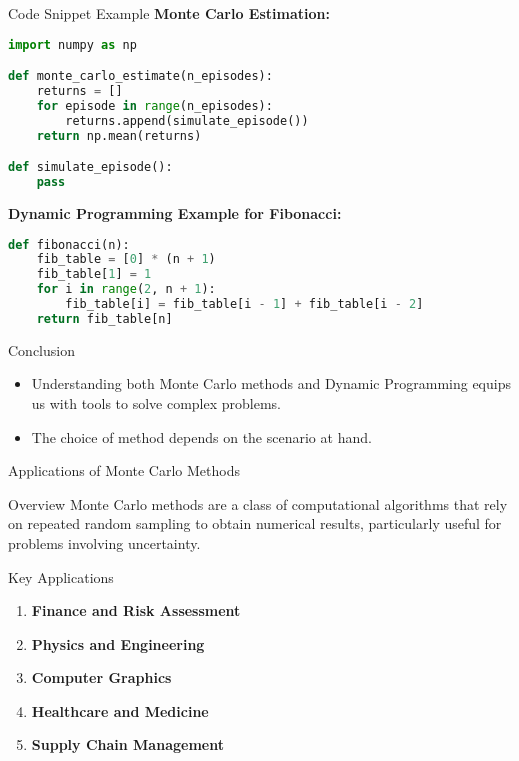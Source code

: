 \documentclass[aspectratio=169]{beamer}
\begin{document}
\begin{frame}[fragile]{Code Snippet Example}
    \textbf{Monte Carlo Estimation:}
    \begin{lstlisting}[language=Python]
import numpy as np

def monte_carlo_estimate(n_episodes):
    returns = []
    for episode in range(n_episodes):
        returns.append(simulate_episode()) 
    return np.mean(returns)

def simulate_episode():
    pass
    \end{lstlisting}

    \textbf{Dynamic Programming Example for Fibonacci:}
    \begin{lstlisting}[language=Python]
def fibonacci(n):
    fib_table = [0] * (n + 1)
    fib_table[1] = 1
    for i in range(2, n + 1):
        fib_table[i] = fib_table[i - 1] + fib_table[i - 2]
    return fib_table[n]
    \end{lstlisting}
\end{frame}

\begin{frame}{Conclusion}
    \begin{itemize}
        \item Understanding both Monte Carlo methods and Dynamic Programming equips us with tools to solve complex problems.
        \item The choice of method depends on the scenario at hand.
    \end{itemize}
\end{frame}

\begin{frame}{Applications of Monte Carlo Methods}
    \begin{block}{Overview}
        Monte Carlo methods are a class of computational algorithms that rely on repeated random sampling to obtain numerical results, particularly useful for problems involving uncertainty.
    \end{block}
\end{frame}

\begin{frame}{Key Applications}
    \begin{enumerate}
        \item \textbf{Finance and Risk Assessment}
        \item \textbf{Physics and Engineering}
        \item \textbf{Computer Graphics}
        \item \textbf{Healthcare and Medicine}
        \item \textbf{Supply Chain Management}
    \end{enumerate}
\end{frame}
\end{document}
